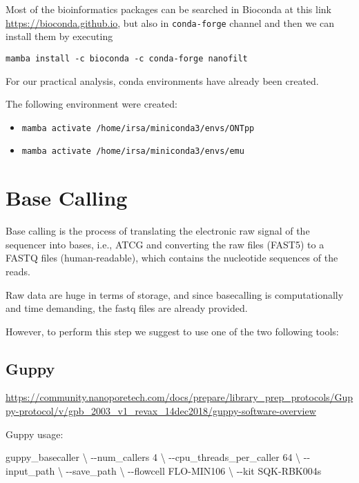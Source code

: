 \documentclass[
]{book}
\newenvironment{Shaded}{\begin{snugshade}}{\end{snugshade}}
\newcommand{\AttributeTok}[1]{\textcolor[rgb]{0.13,0.29,0.53}{#1}}
\newcommand{\DataTypeTok}[1]{\textcolor[rgb]{0.13,0.29,0.53}{#1}}
\newcommand{\ExtensionTok}[1]{#1}
\newcommand{\NormalTok}[1]{#1}
\providecommand{\tightlist}{%
  \setlength{\itemsep}{0pt}\setlength{\parskip}{0pt}}
\begin{document}
Most of the bioinformatics packages can be searched in Bioconda at this link \url{https://bioconda.github.io}, but also in \texttt{conda-forge} channel and then we can install them by executing

\begin{verbatim}
mamba install -c bioconda -c conda-forge nanofilt
\end{verbatim}

For our practical analysis, conda environments have already been created.

The following environment were created:

\begin{itemize}
\tightlist
\item
  \texttt{mamba\ activate\ /home/irsa/miniconda3/envs/ONTpp}
\item
  \texttt{mamba\ activate\ /home/irsa/miniconda3/envs/emu}
\end{itemize}

\section{Base Calling}\label{base-calling}

Base calling is the process of translating the electronic raw signal of the sequencer into bases, i.e., ATCG and converting the raw files (FAST5) to a FASTQ files (human-readable), which contains the nucleotide sequences of the reads.

Raw data are huge in terms of storage, and since basecalling is computationally and time demanding, the fastq files are already provided.

However, to perform this step we suggest to use one of the two following tools:

\subsection{Guppy}\label{guppy}

\url{https://community.nanoporetech.com/docs/prepare/library_prep_protocols/Guppy-protocol/v/gpb_2003_v1_revax_14dec2018/guppy-software-overview}

Guppy usage:

\begin{Shaded}
\begin{Highlighting}[]
\ExtensionTok{guppy\_basecaller} \DataTypeTok{\textbackslash{}}
  \AttributeTok{{-}{-}num\_callers}\NormalTok{ 4 }\DataTypeTok{\textbackslash{}}
  \AttributeTok{{-}{-}cpu\_threads\_per\_caller}\NormalTok{ 64 }\DataTypeTok{\textbackslash{}}
  \AttributeTok{{-}{-}input\_path} \DataTypeTok{\textbackslash{}}
  \AttributeTok{{-}{-}save\_path} \DataTypeTok{\textbackslash{}}
  \AttributeTok{{-}{-}flowcell}\NormalTok{ FLO{-}MIN106 }\DataTypeTok{\textbackslash{}}
  \AttributeTok{{-}{-}kit}\NormalTok{ SQK{-}RBK004s}
\end{Highlighting}
\end{Shaded}
\end{document}
